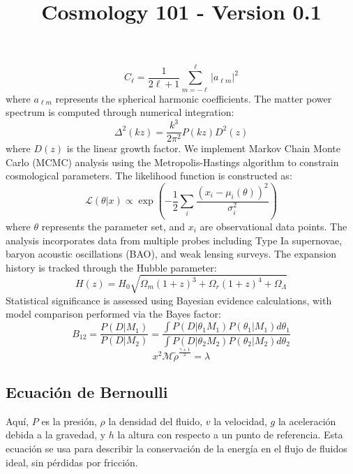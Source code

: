 \documentclass{article}\usepackage{graphicx} \usepackage{amsmath} \usepackage{colortbl}\title{Cosmology 101 - Version 0.1}
\begin{document}
\begin{equation} C_\ell = \frac{1}{2\ell + 1}\sum_{m=-\ell}^{\ell} |a_{\ell m}|^2 
\end{equation}  
where $a_{\ell m}$ represents the spherical harmonic coefficients. The matter power spectrum is computed through numerical integration:  \begin{equation} \Delta^2(k z) = \frac{k^3}{2\pi^2}P(k z)D^2(z) 
\end{equation}  
where $D(z)$ is the linear growth factor. We implement Markov Chain Monte Carlo (MCMC) analysis using the Metropolis-Hastings algorithm to constrain cosmological parameters. The likelihood function is constructed as:  
\begin{equation} 
\mathcal{L}(\theta|x) \propto \exp\left(-\frac{1}{2}\sum_i \frac{(x_i - \mu_i(\theta))^2}{\sigma_i^2}\right) 
\end{equation}  
where $\theta$ represents the parameter set, and $x_i$ are observational data points. The analysis incorporates data from multiple probes including Type Ia supernovae, baryon acoustic oscillations (BAO), and weak lensing surveys. The expansion history is tracked through the Hubble parameter:  
\begin{equation} H(z) = H_0\sqrt{\Omega_m(1+z)^3 + \Omega_r(1+z)^4 + \Omega_\Lambda} 
\end{equation}  
Statistical significance is assessed using Bayesian evidence calculations, with model comparison performed via the Bayes factor:  \begin{equation} B_{12} = \frac{P(D|M_1)}{P(D|M_2)} = \frac{\int P(D|\theta_1 M_1)P(\theta_1|M_1)d\theta_1}{\int P(D|\theta_2 M_2)P(\theta_2|M_2)d\theta_2} 
\end{equation} \begin{equation}x^2 \mathcal{M} \tilde{\rho }^{\frac{\gamma +1}{2}}=\lambda \label{ber1} \end{equation}\subsection{Ecuaci{\'o}n de Bernoulli}
Aquí, $P$ es la presión, $\rho$ la densidad del fluido, $v$ la velocidad, $g$ la aceleración debida a la gravedad, y $h$ la altura con respecto a un punto de referencia. Esta ecuaci{\'o}n se usa para describir la conservación de la energía en el flujo de fluidos ideal, sin pérdidas por fricción.
\end{document}
